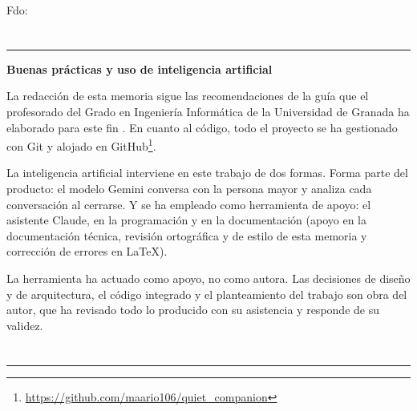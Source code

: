 \noindent Fdo: \theauthor

\vspace{1cm}

\begin{flushright}
\myLocation
\end{flushright}

\chapter*{}
\thispagestyle{empty}

\noindent\rule[-1ex]{\textwidth}{2pt}\par\vspace{\dimexpr4.5ex+\baselineskip\relax}

{}
\textbf{Buenas prácticas y uso de inteligencia artificial}\par\vspace{\baselineskip}

La redacción de esta memoria sigue las recomendaciones de la guía que el profesorado del Grado en Ingeniería Informática de la Universidad de Granada ha elaborado para este fin \citep{GuillenPerales2025}. En cuanto al código, todo el proyecto se ha gestionado con Git y alojado en GitHub\footnote{\url{https://github.com/maario106/quiet_companion}}.

La inteligencia artificial interviene en este trabajo de dos formas. Forma parte del producto: el modelo Gemini conversa con la persona mayor y analiza cada conversación al cerrarse. Y se ha empleado como herramienta de apoyo: el asistente Claude, en la programación y en la documentación (apoyo en la documentación técnica, revisión ortográfica y de estilo de esta memoria y corrección de errores en \LaTeX).

La herramienta ha actuado como apoyo, no como autora. Las decisiones de diseño y de arquitectura, el código integrado y el planteamiento del trabajo son obra del autor, que ha revisado todo lo producido con su asistencia y responde de su validez.

\chapter*{}
\thispagestyle{empty}

\noindent\rule[-1ex]{\textwidth}{2pt}\par\vspace{\dimexpr4.5ex+\baselineskip\relax}

